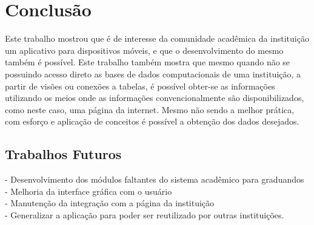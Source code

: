 \chapter{Conclusão}

Este trabalho mostrou que é de interesse da comunidade acadêmica da instituição um aplicativo para dispositivos móveis, e que o desenvolvimento do mesmo também é possível. Este trabalho também mostra que mesmo quando não se possuindo acesso direto as bases de dados computacionais de uma instituição, a partir de visões ou conexões a tabelas, é possível obter-se as informações utilizando os meios onde as informações convencionalmente são disponibilizados, como neste caso, uma página da internet. Mesmo não sendo a melhor prática, com esforço e aplicação de conceitos é possível a obtenção dos dados desejados.

\section{Trabalhos Futuros}

- Desenvolvimento dos módulos faltantes do sistema acadêmico para graduandos \\
- Melhoria da interface gráfica com o usuário \\
- Manutenção da integração com a página da instituição \\
- Generalizar a aplicação para poder ser reutilizado por outras instituições.
